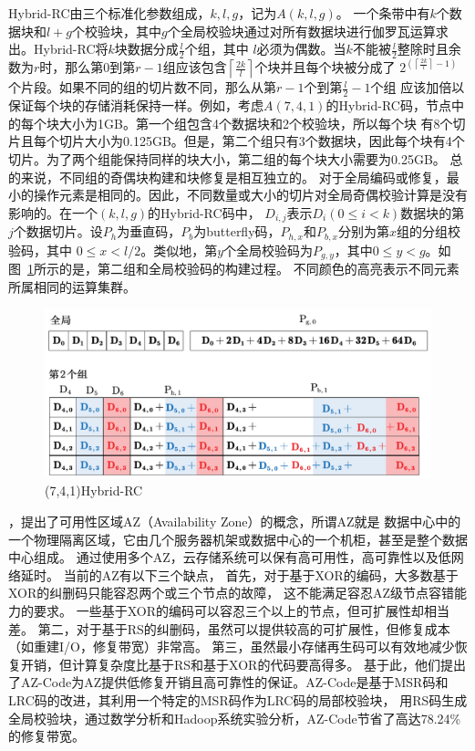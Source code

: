 Hybrid-RC由三个标准化参数组成，$k,l,g$，记为$A(k,l,g)$。
一个条带中有$k$个数据块和$l+g$个校验块，其中$g$个全局校验块通过对所有数据块进行伽罗瓦运算求出。Hybrid-RC将$k$块数据分成$\frac{l}{2}$个组，其中
$l$必须为偶数。当$k$不能被$\frac{l}{2}$整除时且余数为$r$时，那么第0到第$r-1$组应该包含$\left\lceil\frac{2 k}{l}\right\rceil$个块并且每个块被分成了
$2^{\left(\left\lceil\frac{2 k}{l}\right\rceil-1\right)}$个片段。如果不同的组的切片数不同，那么从第$r-1$个到第$\frac{l}{2}-1$个组
应该加倍以保证每个块的存储消耗保持一样。例如，考虑$A(7,4,1)$的Hybrid-RC码，节点中的每个块大小为1GB。第一个组包含4个数据块和2个校验块，所以每个块
有8个切片且每个切片大小为0.125GB。但是，第二个组只有3个数据块，因此每个块有4个切片。为了两个组能保持同样的块大小，第二组的每个块大小需要为0.25GB。
总的来说，不同组的奇偶块构建和块修复是相互独立的。
对于全局编码或修复，最小的操作元素是相同的。因此，不同数量或大小的切片对全局奇偶校验计算是没有影响的。在一个$(k,l,g)$的Hybrid-RC码中，
$D_{i,j}$表示$D_{i}(0 \leq i<k)$数据块的第$j$个数据切片。设$P_h$为垂直码，$P_b$为butterfly码，$P_{h,x}$和$P_{b,x}$分别为第$x$组的分组校验码，其中
$0 \leq x<l / 2$。类似地，第$y$个全局校验码为$P_{g,y}$，其中$0 \leq y < g$。如图~\ref{fig:con-2.1}所示的是，第二组和全局校验码的构建过程。
不同颜色的高亮表示不同元素所属相同的运算集群。

\begin{figure}[htbp]
	\centering
	\includegraphics [scale=0.7]{figures/2.1.pdf}
	\caption{(7,4,1)Hybrid-RC}
	\label{fig:con-2.1}
\end{figure}

\citet{xie2019az}，提出了可用性区域AZ（Availability Zone）的概念，所谓AZ就是
数据中心中的一个物理隔离区域，它由几个服务器机架或数据中心的一个机柜，甚至是整个数据中心组成。
通过使用多个AZ，云存储系统可以保有高可用性，高可靠性以及低网络延时。
当前的AZ有以下三个缺点，
首先，对于基于XOR的编码，大多数基于XOR的纠删码\citep{corbett2004row,blaum1995evenodd}只能容忍两个或三个节点的故障，
这不能满足容忍AZ级节点容错能力的要求。
一些基于XOR的编码可以容忍三个以上的节点，但可扩展性却相当差\cite{zhang2015tip,huang2008star}。
第二，对于基于RS的纠删码，虽然可以提供较高的可扩展性，但修复成本（如重建I/O，修复带宽）非常高。
第三，虽然最小存储再生码\cite{vajha2018clay,ye2017explicit}可以有效地减少恢复开销，但计算复杂度比基于RS和基于XOR的代码要高得多。
基于此，他们提出了AZ-Code为AZ提供低修复开销且高可靠性的保证。AZ-Code是基于MSR码和LRC码的改进，其利用一个特定的MSR码作为LRC码的局部校验块，
用RS码生成全局校验块，通过数学分析和Hadoop系统实验分析，AZ-Code节省了高达78.24\%的修复带宽。



